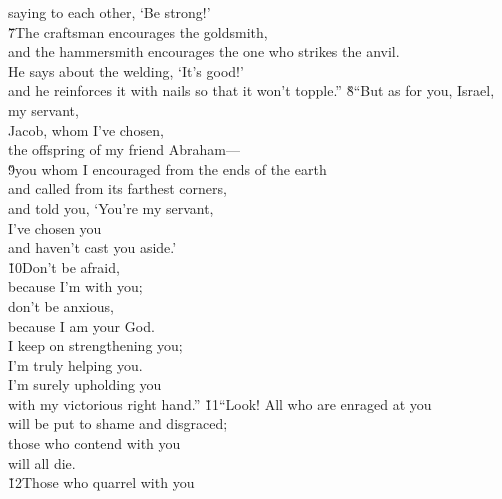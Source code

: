\begin{poetry}
\poemll    saying to each other, `Be strong!' \\
\poeml \v{7}The craftsman encourages the goldsmith, \\
\poemll    and the hammersmith encourages the one who strikes the anvil. \\
\poeml He says about the welding, `It's good!' \\
\poemll    and he reinforces it with nails so that it won't topple.''
\poeml \v{8}``But as for you, Israel, my servant, \\
\poemll    Jacob, whom I've chosen, \\
\poemlll       the offspring of my friend Abraham--- \\
\poeml \v{9}you whom I encouraged from the ends of the earth \\
\poemll    and called from its farthest corners, \\
\poeml and told you, `You're my servant, \\
\poemll    I've chosen you \\
\poemlll       and haven't cast you aside.' \\
\poeml \v{10}Don't be afraid, \\
\poemll    because I'm with you; \\
\poeml don't be anxious, \\
\poemll    because I am your God. \\
\poeml I keep on strengthening you; \\
\poemll    I'm truly helping you. \\
\poeml I'm surely upholding you \\
\poemll    with my victorious right hand.''
\poeml \v{11}``Look! All who are enraged at you \\
\poemll    will be put to shame and disgraced; \\
\poeml those who contend with you \\
\poemll    will all die. \\
\poeml \v{12}Those who quarrel with you \\

\end{poetry}
